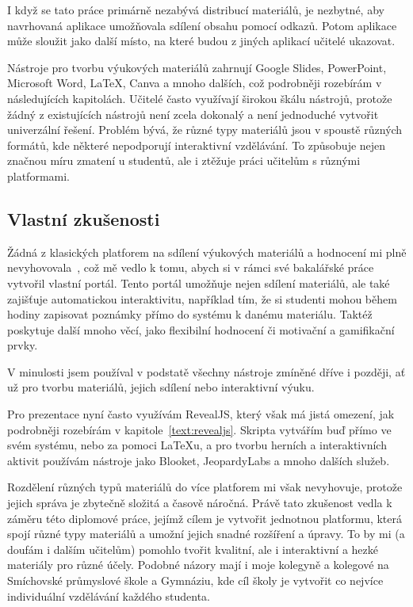 I když se tato práce primárně nezabývá distribucí materiálů, je nezbytné, aby navrhovaná aplikace umožňovala sdílení obsahu pomocí odkazů.
Potom aplikace může sloužit jako další místo, na které budou z jiných aplikací učitelé ukazovat.

Nástroje pro tvorbu výukových materiálů zahrnují Google Slides, PowerPoint, Microsoft Word, \LaTeX, Canva a mnoho dalších, což podrobněji rozebírám v následujících kapitolách.
Učitelé často využívají širokou škálu nástrojů, protože žádný z existujících nástrojů není zcela dokonalý a není jednoduché vytvořit univerzální řešení.
Problém bývá, že různé typy materiálů jsou v spoustě různých formátů, kde některé nepodporují interaktivní vzdělávání.
To způsobuje nejen značnou míru zmatení u studentů, ale i ztěžuje práci učitelům s různými platformami.

\subsection{Vlastní zkušenosti}

Žádná z klasických platforem na sdílení výukových materiálů a hodnocení mi plně nevyhovovala~\cite{cajthaml_bp}, což mě vedlo k tomu, abych si v rámci své bakalářské práce vytvořil vlastní portál.
Tento portál umožňuje nejen sdílení materiálů, ale také zajišťuje automatickou interaktivitu, například tím, že si studenti mohou během hodiny zapisovat poznámky přímo do systému k danému materiálu.
Taktéž poskytuje další mnoho věcí, jako flexibilní hodnocení či motivační a gamifikační prvky.

V minulosti jsem používal v podstatě všechny nástroje zmíněné dříve i později, ať už pro tvorbu materiálů, jejich sdílení nebo interaktivní výuku.

Pro prezentace nyní často využívám RevealJS, který však má jistá omezení, jak podrobněji rozebírám v kapitole~\ref{text:revealjs}.
Skripta vytvářím buď přímo ve svém systému, nebo za pomoci LaTeXu, a pro tvorbu herních a interaktivních aktivit používám nástroje jako Blooket, JeopardyLabs a mnoho dalších služeb.

Rozdělení různých typů materiálů do více platforem mi však nevyhovuje, protože jejich správa je zbytečně složitá a časově náročná.
Právě tato zkušenost vedla k záměru této diplomové práce, jejímž cílem je vytvořit jednotnou platformu, která spojí různé typy materiálů a umožní jejich snadné rozšíření a úpravy.
To by mi (a doufám i dalším učitelům) pomohlo tvořit kvalitní, ale i interaktivní a hezké materiály pro různé účely.
Podobné názory mají i moje kolegyně a kolegové na Smíchovské průmyslové škole a Gymnáziu, kde cíl školy je vytvořit co nejvíce individuální vzdělávání každého studenta.


